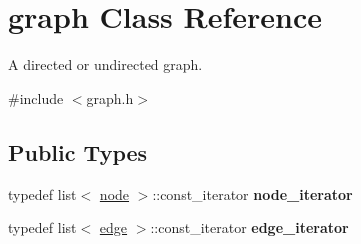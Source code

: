 \hypertarget{classgraph}{}\section{graph Class Reference}
\label{classgraph}


A directed or undirected graph.  




{\ttfamily \#include $<$graph.\+h$>$}

\subsection*{Public Types}
\begin{DoxyCompactItemize}
\item 
\mbox{\label{classgraph_af7c0a63239289ac1d6bd6ec1702e1efa}} 
typedef list$<$ \mbox{\hyperlink{classnode}{node}} $>$\+::const\+\_\+iterator {\bfseries node\+\_\+iterator}
\item 
\mbox{\label{classgraph_a793123ccbb4234e88b8221c3dc17bf17}} 
typedef list$<$ \mbox{\hyperlink{classedge}{edge}} $>$\+::const\+\_\+iterator {\bfseries edge\+\_\+iterator}
\end{DoxyCompactItemize}
